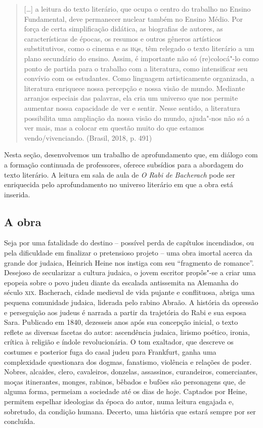 \documentclass[12pt]{extarticle}
\begin{document}
\begin{quote}
{[}\ldots{}{]} a leitura do texto literário, que ocupa o centro do trabalho
no Ensino Fundamental, deve permanecer nuclear também no Ensino Médio.
Por força de certa simplificação didática, as biografias de autores, as
características de épocas, os resumos e outros gêneros artísticos
substitutivos, como o cinema e as \textsc{hq}s, têm relegado o texto literário a
um plano secundário do ensino. Assim, é importante não só (re)colocá"-lo
como ponto de partida para o trabalho com a literatura, como
intensificar seu convívio com os estudantes. Como linguagem
artisticamente organizada, a literatura enriquece nossa percepção e
nossa visão de mundo. Mediante arranjos especiais das palavras, ela cria
um universo que nos permite aumentar nossa capacidade de ver e sentir.
Nesse sentido, a literatura possibilita uma ampliação da nossa visão do
mundo, ajuda"-nos não só a ver mais, mas a colocar em questão muito do
que estamos vendo/vivenciando. (Brasil, 2018, p. 491)
\end{quote}

Nesta seção, desenvolvemos um trabalho de aprofundamento que, em diálogo
com a formação continuada de professores, oferece subsídios para a
abordagem do texto literário. A leitura em sala de aula de \emph{O Rabi
de Bacherach} pode ser enriquecida pelo aprofundamento no universo
literário em que a obra está inserida.

\subsection{A obra}

Seja por uma fatalidade do destino -- possível perda de capítulos
incendiados, ou pela dificuldade em finalizar o pretensioso projeto --
uma obra imortal acerca da grande dor judaica, Heinrich Heine nos
instiga com seu ``fragmento de romance''. Desejoso de secularizar a
cultura judaica, o jovem escritor propôs"-se a criar uma epopeia sobre o
povo judeu diante da escalada antissemita na Alemanha do século \textsc{xix}.
Bacherach, cidade medieval de vida pujante e conflituosa, abriga uma
pequena comunidade judaica, liderada pelo rabino Abraão. A história da
opressão e perseguição aos judeus é narrada a partir da trajetória do
Rabi e sua esposa Sara. Publicado em 1840, dezesseis anos após sua
concepção inicial, o texto reflete as diversas facetas do autor:
ascendência judaica, lirismo poético, ironia, crítica à religião e
índole revolucionária. O tom exaltador, que descreve os costumes e
posterior fuga do casal judeu para Frankfurt, ganha uma complexidade
questionara dos dogmas, fanatismo, violência e relações de poder.
Nobres, alcaides, clero, cavaleiros, donzelas, assassinos, curandeiros,
comerciantes, moças itinerantes, monges, rabinos, bêbados e bufões são
personagens que, de alguma forma, permeiam a sociedade até os dias de
hoje. Captados por Heine, permitem espelhar ideologias da época do
autor, numa leitura engajada e, sobretudo, da condição humana. Decerto,
uma história que estará sempre por ser concluída.
\end{document}
